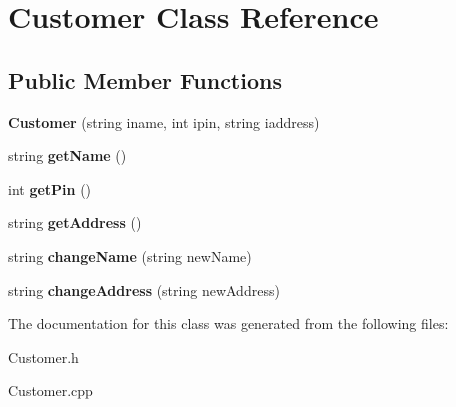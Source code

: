 \hypertarget{classCustomer}{}\section{Customer Class Reference}
\label{classCustomer}
\subsection*{Public Member Functions}
\begin{DoxyCompactItemize}
\item 
{\bfseries Customer} (string iname, int ipin, string iaddress)\hypertarget{classCustomer_ad0ee1a51693f5fae745ea9f870a963d0}{}\label{classCustomer_ad0ee1a51693f5fae745ea9f870a963d0}

\item 
string {\bfseries get\+Name} ()\hypertarget{classCustomer_a1bda0c5a9b2f4bf0c3314832e95f2566}{}\label{classCustomer_a1bda0c5a9b2f4bf0c3314832e95f2566}

\item 
int {\bfseries get\+Pin} ()\hypertarget{classCustomer_a65c77b6d5826427aef7138f663ca21a5}{}\label{classCustomer_a65c77b6d5826427aef7138f663ca21a5}

\item 
string {\bfseries get\+Address} ()\hypertarget{classCustomer_aebd5a3862a90a21ec56198a69dbe7f34}{}\label{classCustomer_aebd5a3862a90a21ec56198a69dbe7f34}

\item 
string {\bfseries change\+Name} (string new\+Name)\hypertarget{classCustomer_a6ef497d79b565e479a7807dad7027ecc}{}\label{classCustomer_a6ef497d79b565e479a7807dad7027ecc}

\item 
string {\bfseries change\+Address} (string new\+Address)\hypertarget{classCustomer_a4eeaf4fadbd450526054ad94cccf52ad}{}\label{classCustomer_a4eeaf4fadbd450526054ad94cccf52ad}

\end{DoxyCompactItemize}


The documentation for this class was generated from the following files\+:\begin{DoxyCompactItemize}
\item 
Customer.\+h\item 
Customer.\+cpp\end{DoxyCompactItemize}
